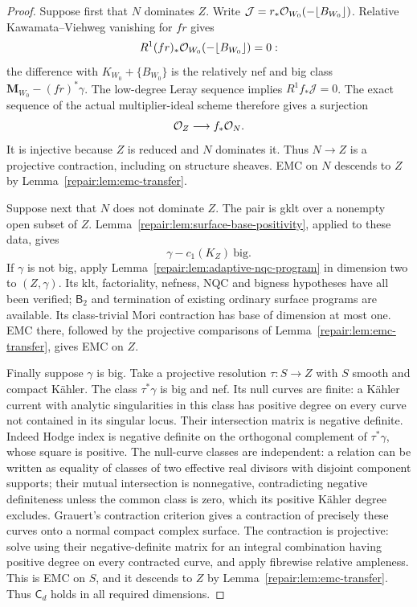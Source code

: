 \begin{proof}
Suppose first that $N$ dominates $Z$. Write
$\mathcal J=r_*\mathcal O_{W_0}(-\lfloor B_{W_0}\rfloor)$.
Relative Kawamata--Viehweg vanishing for $fr$ gives
\[
 R^1(fr)_*\mathcal O_{W_0}(-\lfloor B_{W_0}\rfloor)=0:
\]
the difference with $K_{W_0}+\{B_{W_0}\}$ is the relatively
nef and big class $\mathbf M_{W_0}-(fr)^*\gamma$.
The low-degree Leray sequence implies $R^1f_*\mathcal J=0$.
The exact sequence of the actual multiplier-ideal scheme therefore
gives a surjection
\[
                         \mathcal O_Z\longrightarrow f_*\mathcal O_N.
\]
It is injective because $Z$ is reduced and $N$ dominates it.
Thus $N\to Z$ is a projective contraction, including on structure
sheaves. EMC on $N$ descends to $Z$ by
Lemma~\ref{repair:lem:emc-transfer}.

Suppose next that $N$ does not dominate $Z$. The pair is gklt
over a nonempty open subset of $Z$.
Lemma~\ref{repair:lem:surface-base-positivity}, applied to these
data, gives
\[
                             \gamma-c_1(K_Z)\ \text{big}.
\]
If $\gamma$ is not big, apply
Lemma~\ref{repair:lem:adaptive-nqc-program} in dimension two to
$(Z,\gamma)$. Its klt, factoriality, nefness, NQC and bigness
hypotheses have all been verified; $\mathsf B_2$ and termination
of existing ordinary surface programs are available. Its
class-trivial Mori contraction has base of dimension at most one.
EMC there, followed by the projective comparisons of
Lemma~\ref{repair:lem:emc-transfer}, gives EMC on $Z$.

Finally suppose $\gamma$ is big. Take a projective resolution
$\tau:S\to Z$ with $S$ smooth and compact K\"ahler.
The class $\tau^*\gamma$ is big and nef. Its
null curves are finite: a K\"ahler current with analytic
singularities in this class has positive degree on every curve
not contained in its singular locus. Their intersection matrix is
negative definite. Indeed Hodge index is negative definite on the
orthogonal complement of $\tau^*\gamma$, whose square is positive.
The null-curve classes are independent: a relation can be written
as equality of classes of two effective real divisors with disjoint
component supports; their mutual intersection is nonnegative,
contradicting negative definiteness unless the common class is
zero, which its positive K\"ahler degree excludes.
Grauert's contraction criterion \cite{Grauert1962} gives a
contraction of precisely these curves onto a normal compact complex
surface. The contraction is projective: solve
using their negative-definite matrix for an integral combination
having positive degree on every contracted curve, and apply
fibrewise relative ampleness. This is EMC on $S$, and it descends
to $Z$ by Lemma~\ref{repair:lem:emc-transfer}.
Thus $\mathsf C_d$ holds in all required dimensions.


\end{proof}
